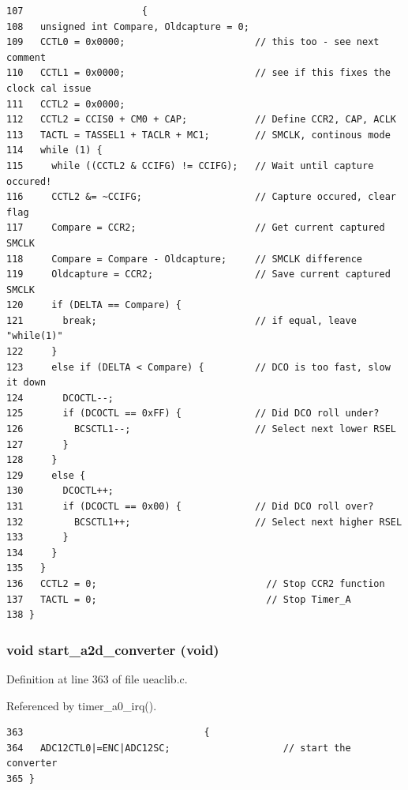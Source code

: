 \footnotesize\begin{verbatim}107                     { 
108   unsigned int Compare, Oldcapture = 0;
109   CCTL0 = 0x0000;                       // this too - see next comment
110   CCTL1 = 0x0000;                       // see if this fixes the clock cal issue
111   CCTL2 = 0x0000;
112   CCTL2 = CCIS0 + CM0 + CAP;            // Define CCR2, CAP, ACLK
113   TACTL = TASSEL1 + TACLR + MC1;        // SMCLK, continous mode
114   while (1) {
115     while ((CCTL2 & CCIFG) != CCIFG);   // Wait until capture occured!
116     CCTL2 &= ~CCIFG;                    // Capture occured, clear flag
117     Compare = CCR2;                     // Get current captured SMCLK
118     Compare = Compare - Oldcapture;     // SMCLK difference
119     Oldcapture = CCR2;                  // Save current captured SMCLK
120     if (DELTA == Compare) {
121       break;                            // if equal, leave "while(1)"
122     }
123     else if (DELTA < Compare) {         // DCO is too fast, slow it down
124       DCOCTL--;
125       if (DCOCTL == 0xFF) {             // Did DCO roll under?
126         BCSCTL1--;                      // Select next lower RSEL
127       }
128     }
129     else {                      
130       DCOCTL++;
131       if (DCOCTL == 0x00) {             // Did DCO roll over?
132         BCSCTL1++;                      // Select next higher RSEL
133       }
134     }
135   }  
136   CCTL2 = 0;                              // Stop CCR2 function
137   TACTL = 0;                              // Stop Timer_A
138 }
\end{verbatim}\normalsize 


\subsubsection{\setlength{\rightskip}{0pt plus 5cm}void start\_\-a2d\_\-converter (void)}\label{ueaclib_8c_a9}




Definition at line 363 of file ueaclib.c.

Referenced by timer\_\-a0\_\-irq().

\footnotesize\begin{verbatim}363                                {
364   ADC12CTL0|=ENC|ADC12SC;                    // start the converter 
365 }  
\end{verbatim}\normalsize 


